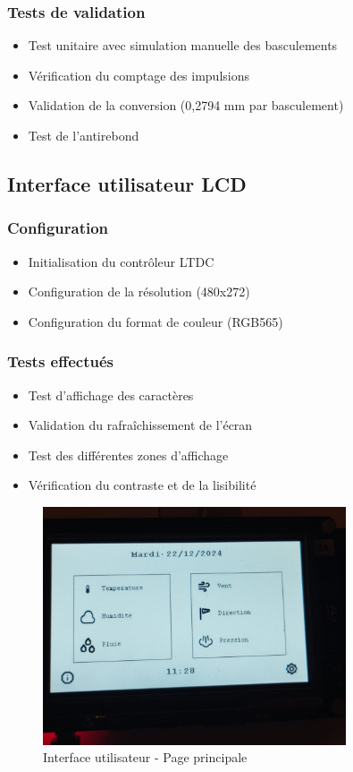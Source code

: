 \documentclass[12pt]{article}
\begin{document}
\subsubsection{Tests de validation}
\begin{itemize}
    \item Test unitaire avec simulation manuelle des basculements
    \item Vérification du comptage des impulsions
    \item Validation de la conversion (0,2794 mm par basculement)
    \item Test de l'antirebond
\end{itemize}

\subsection{Interface utilisateur LCD}
\subsubsection{Configuration}
\begin{itemize}
    \item Initialisation du contrôleur LTDC
    \item Configuration de la résolution (480x272)
    \item Configuration du format de couleur (RGB565)
\end{itemize}

\subsubsection{Tests effectués}
\begin{itemize}
    \item Test d'affichage des caractères
    \item Validation du rafraîchissement de l'écran
    \item Test des différentes zones d'affichage
    \item Vérification du contraste et de la lisibilité
\end{itemize}

\begin{figure}[H]
    \capstart
    \centering
    \includegraphics[width=0.8\textwidth]{./images/interface_mainpage.jpg}
    \caption{Interface utilisateur - Page principale}
    \label{fig:interface_mainpage}
\end{figure}
\end{document}
